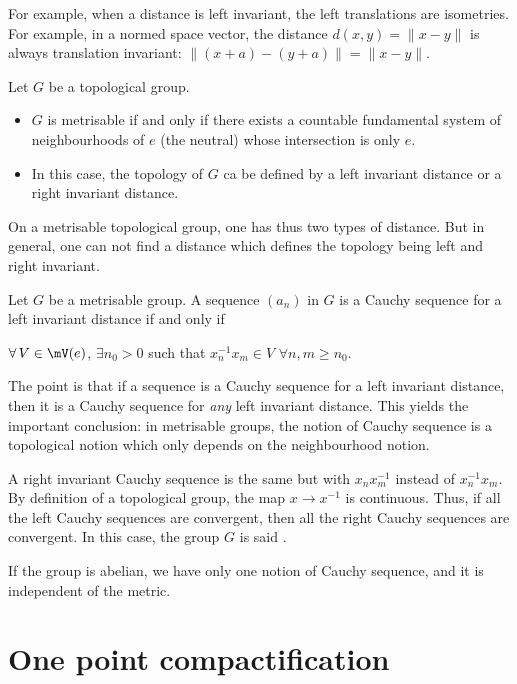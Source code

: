 For example, when a distance is left invariant, the left translations are isometries. For example, in a normed space vector, the distance $d(x,y)=\|x-y\|$ is always translation invariant: $\| (x+a)-(y+a) \|=\|x-y\|$.



\begin{proposition}
    Let $G$ be a topological group.
\begin{itemize}
\item $G$ is metrisable if and only if there exists a countable fundamental system of neighbourhoods of $e$ (the neutral) whose intersection is only $e$.
\item In this case, the topology of $G$ ca be defined by a left invariant distance or a right invariant distance.
\end{itemize}
\end{proposition}




On a metrisable topological group, one has thus two types of distance. But in general, one can not find a distance which defines the topology being left and right invariant.

\begin{proposition}
Let $G$ be a metrisable group. A sequence $(a_n)$ in $G$ is a Cauchy sequence for a left invariant distance if and only if

 $\forall\, V\in\mV(e)$, $\exists n_0>0$ such that $x_n^{-1} x_m\in V$ $\forall n,m\geq n_0$.
\label{prop:Cauchy_metrisable}
\end{proposition}

The point is that if a sequence is a Cauchy sequence for a left invariant distance, then it is a Cauchy sequence for \emph{any} left invariant distance. This yields the important conclusion: in metrisable groups, the notion of Cauchy sequence is a topological notion which only depends on the neighbourhood notion.

A right invariant Cauchy sequence is the same but with $x_nx_m^{-1}$ instead of $x_n^{-1} x_m$. By definition of a topological group, the map $x\to x^{-1}$ is continuous. Thus, if all the left Cauchy sequences are convergent, then all the right Cauchy sequences are convergent. In this case, the group $G$ is said .

If the group is abelian, we have only one notion of Cauchy sequence, and it is independent of the metric.

\section{One point compactification}  \label{sec:compactific}

